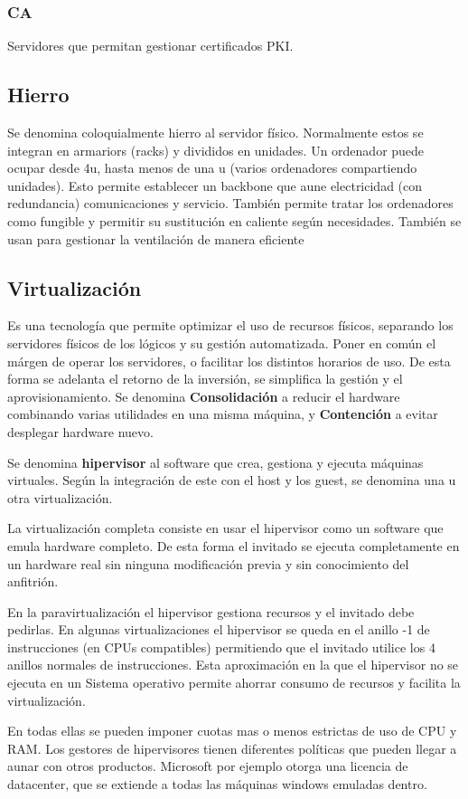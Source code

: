     \subsubsection{CA}
        Servidores que permitan gestionar certificados PKI.
        
\subsection{Hierro}
    Se denomina coloquialmente hierro al servidor físico. Normalmente estos se integran en armariors (racks) y divididos en unidades. Un ordenador puede ocupar desde 4u, hasta menos de una u (varios ordenadores compartiendo unidades). Esto permite establecer un backbone que aune electricidad (con redundancia) comunicaciones y servicio. También permite tratar los ordenadores como fungible y permitir su sustitución en caliente según necesidades. También se usan para gestionar la ventilación de manera eficiente

\subsection{Virtualización}
    Es una tecnología que permite optimizar el uso de recursos físicos, separando los servidores físicos de los lógicos y su gestión automatizada. Poner en común el márgen de operar los servidores, o facilitar los distintos horarios de uso. De esta forma se adelanta el retorno de la inversión, se simplifica la gestión y el aprovisionamiento. Se denomina \textbf{Consolidación} a reducir el hardware combinando varias utilidades en una misma máquina, y \textbf{Contención} a evitar desplegar hardware nuevo.

    Se denomina \textbf{hipervisor} al software que crea, gestiona y ejecuta máquinas virtuales. Según la integración de este con el host y los guest, se denomina una u otra virtualización.

    La virtualización completa consiste en usar el hipervisor como un software que emula hardware completo. De esta forma el invitado se ejecuta completamente en un hardware real sin ninguna modificación previa y sin conocimiento del anfitrión.

    En la paravirtualización el hipervisor gestiona recursos y el invitado debe pedirlas. En algunas virtualizaciones el hipervisor se queda en el anillo -1 de instrucciones (en CPUs compatibles) permitiendo que el invitado utilice los 4 anillos normales de instrucciones. Esta aproximación en la que el hipervisor no se ejecuta en un Sistema operativo permite ahorrar consumo de recursos y facilita la virtualización.

    En todas ellas se pueden imponer cuotas mas o menos estrictas de uso de CPU y RAM. Los gestores de hipervisores tienen diferentes políticas que pueden llegar a aunar con otros productos. Microsoft por ejemplo otorga una licencia de datacenter, que se extiende a todas las máquinas windows emuladas dentro.
